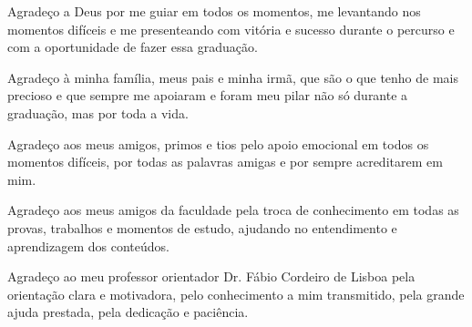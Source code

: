 \begin{agradecimentos}
Agradeço a Deus por me guiar em todos os momentos, me levantando nos momentos difíceis e me presenteando com vitória e sucesso durante o percurso e com a oportunidade de fazer essa graduação.

Agradeço à minha família, meus pais e minha irmã, que são o que tenho de mais precioso e que sempre me apoiaram e foram meu pilar não só durante a graduação, mas por toda a vida. 

Agradeço aos meus amigos, primos e tios pelo apoio emocional em todos os momentos difíceis, por todas as palavras amigas e por sempre acreditarem em mim.

Agradeço aos meus amigos da faculdade pela troca de conhecimento em todas as provas, trabalhos e momentos de estudo, ajudando no entendimento e aprendizagem dos conteúdos.

Agradeço ao meu professor orientador Dr. Fábio Cordeiro de Lisboa pela orientação clara e motivadora, pelo conhecimento a mim transmitido, pela grande ajuda prestada, pela dedicação e paciência.


\end{agradecimentos}
